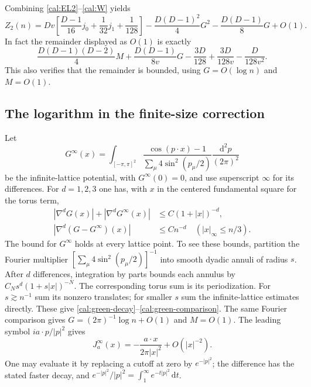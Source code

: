 Combining \eqref{cal:EL2}--\eqref{cal:W} yields
\begin{equation}
\label{cal:Z2}
 Z_2(n)=Dv\left[\frac{D-1}{16}j_0+\frac1{32}j_1+\frac1{128}\right]
 -\frac{D(D-1)^2}{4}G^2-\frac{D(D-1)}8G+O(1).
\end{equation}
In fact the remainder displayed as $O(1)$ is exactly
\[
 \frac{D(D-1)(D-2)}4M+\frac{D(D-1)}{8v}G
       -\frac{3D}{128}+\frac{3D}{128v}-\frac D{128v^2}.
\]
This also verifies that the remainder is bounded, using
$G=O(\log n)$ and $M=O(1)$.

\subsection{The logarithm in the finite-size correction}

Let
\[
 G^\infty(x)=\int_{[-\pi,\pi]^2}
 \frac{\cos(p\cdot x)-1}{\sum_\mu4\sin^2(p_\mu/2)}
 \frac{\mathrm d^2p}{(2\pi)^2}
\]
be the infinite-lattice potential, with $G^\infty(0)=0$, and use
superscript $\infty$ for its differences. For $d=1,2,3$ one has,
with $x$ in the centered fundamental square for the torus term,
\begin{align}
 |\nabla^dG(x)|+|\nabla^dG^\infty(x)|&\le C(1+|x|)^{-d},
 \label{cal:green-decay}\\
 |\nabla^d(G-G^\infty)(x)|&\le Cn^{-d}\quad(|x|_\infty\le n/3).
 \label{cal:green-comparison}
\end{align}
The bound for $G^\infty$ holds at every lattice point.
To see these bounds, partition the Fourier multiplier
$[\sum_\mu4\sin^2(p_\mu/2)]^{-1}$ into smooth dyadic annuli of radius
$s$. After $d$ differences, integration by parts bounds each annulus by
$C_Ns^d(1+s|x|)^{-N}$. The corresponding torus sum is its periodization.
For $s\gtrsim n^{-1}$ sum its nonzero translates; for smaller $s$ sum
the infinite-lattice estimates directly. These give
\eqref{cal:green-decay}--\eqref{cal:green-comparison}. The same Fourier
comparison gives $G=(2\pi)^{-1}\log n+O(1)$ and $M=O(1)$.
The leading symbol $ia\cdot p/|p|^2$ gives
\[
 J_a^\infty(x)=-\frac{a\cdot x}{2\pi|x|^2}+O(|x|^{-2}).
\]
One may evaluate it by replacing a cutoff at zero by $e^{-|p|^2}$;
the difference has the stated faster decay, and
$e^{-|p|^2}/|p|^2=\int_1^\infty e^{-t|p|^2}\,\mathrm dt$.

